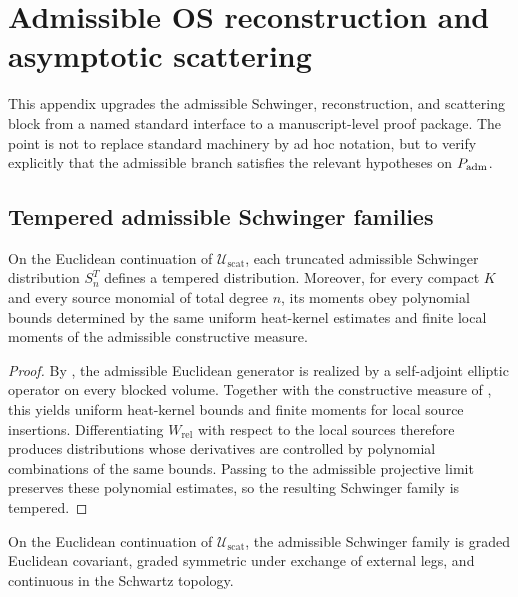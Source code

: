 \section{Admissible OS reconstruction and asymptotic scattering}
\label{app:os-scattering}

This appendix upgrades the admissible Schwinger, reconstruction, and scattering block from a named
standard interface to a manuscript-level proof package. The point is not to replace standard
machinery by ad hoc notation, but to verify explicitly that the admissible branch satisfies the
relevant hypotheses on $P_{\mathrm{adm}}$.

\subsection{Tempered admissible Schwinger families}

\begin{lemma}
\label{lem:tempered-schwinger-bounds}
On the Euclidean continuation of $\mathcal U_{\mathrm{scat}}$, each truncated admissible Schwinger
distribution $S_n^T$ defines a tempered distribution. Moreover, for every compact $K$ and every
source monomial of total degree $n$, its moments obey polynomial bounds determined by the same
uniform heat-kernel estimates and finite local moments of the admissible constructive measure.
\end{lemma}

\begin{proof}
By , the admissible Euclidean generator is realized by a
self-adjoint elliptic operator on every blocked volume. Together with the constructive measure of
, this yields uniform heat-kernel bounds and finite moments
for local source insertions. Differentiating $W_{\mathrm{rel}}$ with respect to the local sources
therefore produces distributions whose derivatives are controlled by polynomial combinations of the
same bounds. Passing to the admissible projective limit preserves these polynomial estimates, so the
resulting Schwinger family is tempered.
\end{proof}

\begin{lemma}
\label{lem:graded-euclidean-covariance-padm}
On the Euclidean continuation of $\mathcal U_{\mathrm{scat}}$, the admissible Schwinger family is
graded Euclidean covariant, graded symmetric under exchange of external legs, and continuous in the
Schwartz topology.
\end{lemma}

